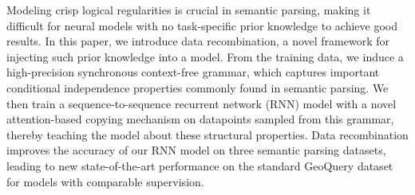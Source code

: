 Modeling crisp logical regularities is crucial in semantic parsing, making it difficult for neural models with no task-specific prior knowledge to achieve good results.  In this paper, we introduce data recombination, a novel framework for injecting such prior knowledge into a model.  From the training data, we induce a high-precision synchronous context-free grammar, which captures important conditional independence properties commonly found in semantic parsing.  We then train a sequence-to-sequence recurrent network (RNN) model with a novel attention-based copying mechanism on datapoints sampled from this grammar, thereby teaching the model about these structural properties. Data recombination improves the accuracy of our RNN model on three semantic parsing datasets, leading to new state-of-the-art performance on the standard GeoQuery dataset for models with comparable supervision.

